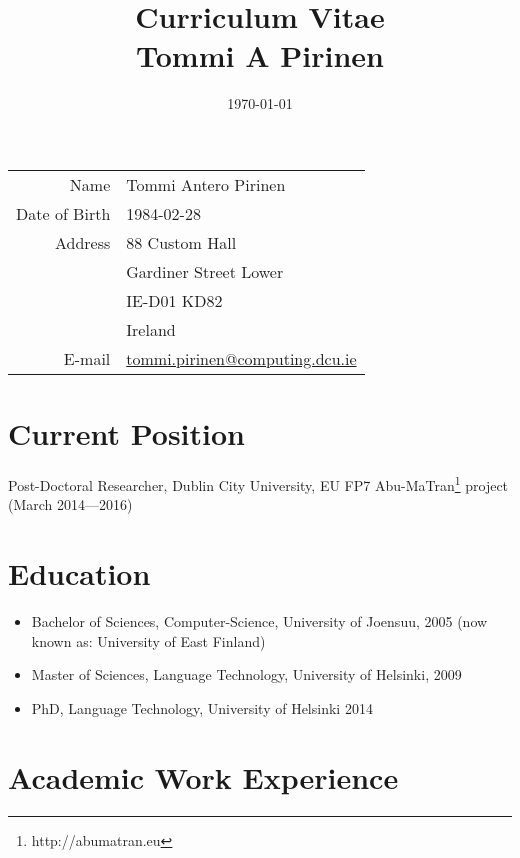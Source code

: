 \documentclass[a4paper]{article}
\title{Curriculum Vitae\\
\small{Tommi A Pirinen}}
\date{\today}
\begin{document}
\maketitle

\begin{tabular}{rl}
Name & Tommi Antero Pirinen \\
Date of Birth & 1984-02-28 \\
Address & 88 Custom Hall \\
& Gardiner Street Lower \\
& IE-D01 KD82\\
& Ireland \\
E-mail & \url{tommi.pirinen@computing.dcu.ie} \\
\end{tabular}


\section*{Current Position}

Post-Doctoral Researcher, Dublin City University, EU FP7 Abu-MaTran\footnote{http://abumatran.eu} project (March 2014---2016)

\section*{Education}

\begin{itemize}
\item Bachelor of Sciences, Computer-Science, University of Joensuu, 2005 (now known as: University of East Finland)
\item Master of Sciences, Language Technology, University of Helsinki, 2009
\item PhD, Language Technology, University of Helsinki 2014
\end{itemize}



\section*{Academic Work Experience}
\end{document}

